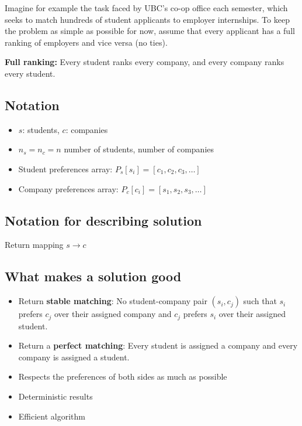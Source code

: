 \documentclass{article}
\begin{document}
Imagine for example the task faced by UBC’s co-op office each semester, which seeks to match hundreds of student applicants to employer internships. To keep the problem as simple as possible for now, assume that every applicant has a full ranking of employers and vice versa (no ties).

\textbf{Full ranking: } Every student ranks every company, and every company ranks every student.

\subsection*{Notation}

\begin{itemize}
    \item $s$: students, $c$: companies
    \item $n_s = n_c = n$ number of students, number of companies
    \item Student preferences array: $P_s[s_i]=[c_1, c_2, c_3, \ldots]$
    \item Company preferences array: $P_c[c_i]=[s_1, s_2, s_3, \ldots]$
\end{itemize}

\subsection*{Notation for describing solution}

Return mapping $s \to c$

\subsection*{What makes a solution good}

\begin{itemize}
    \item Return \textbf{stable matching}: No student-company pair $(s_i, c_j)$ such that $s_i$ prefers $c_j$ over their assigned company and $c_j$ prefers $s_i$ over their assigned student.
    \item Return a \textbf{perfect matching}: Every student is assigned a company and every company is assigned a student.
    \item Respects the preferences of both sides as much as possible
    \item Deterministic results
    \item Efficient algorithm
\end{itemize}
\end{document}
